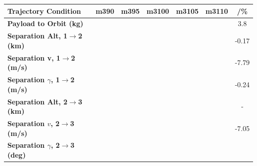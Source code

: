 \begin{table}[ht]
\centering
\begin{tabular}{l c c c c c c} 
	\hline \textbf{Trajectory Condition}
	&m390
	&m395
	&m3100
	&m3105
	&m3110
	& /\%
	\\
	\hline \textbf{Payload to Orbit (kg)}
	& \PayloadToOrbitmThreeNinetyNoReturn
	& \PayloadToOrbitmThreeNinetyFiveNoReturn
	& \PayloadToOrbitmThreeStandardNoReturn
	& \PayloadToOrbitmThreeOneHundredFiveNoReturn
	& \PayloadToOrbitmThreeOneHundredTenNoReturn
	&3.8
	\\
	\textbf{Separation Alt, 1$\rightarrow$2 (km)}
	& \firstsecondSeparationAltmThreeNinetyNoReturn
	& \firstsecondSeparationAltmThreeNinetyFiveNoReturn
	& \firstsecondSeparationAltmThreeStandardNoReturn
	& \firstsecondSeparationAltmThreeOneHundredFiveNoReturn
	& \firstsecondSeparationAltmThreeOneHundredTenNoReturn
	&-0.17
	\\
	\textbf{Separation v, 1$\rightarrow$2 (m/s)}
	& \firstsecondSeparationvmThreeNinetyNoReturn
	& \firstsecondSeparationvmThreeNinetyFiveNoReturn
	& \firstsecondSeparationvmThreeStandardNoReturn
	& \firstsecondSeparationvmThreeOneHundredFiveNoReturn
	& \firstsecondSeparationvmThreeOneHundredTenNoReturn
	&-7.79
	\\
	\textbf{Separation $\gamma$, 1$\rightarrow$2 (m/s)}
	& \firstsecondSeparationgammamThreeNinetyNoReturn
	& \firstsecondSeparationgammamThreeNinetyFiveNoReturn
	& \firstsecondSeparationgammamThreeStandardNoReturn
	& \firstsecondSeparationgammamThreeOneHundredFiveNoReturn
	& \firstsecondSeparationgammamThreeOneHundredTenNoReturn
	&-0.24
	\\
	\textbf{Separation Alt, 2$\rightarrow$3 (km)}
	& \secondthirdSeparationAltmThreeNinetyNoReturn
	& \secondthirdSeparationAltmThreeNinetyFiveNoReturn
	& \secondthirdSeparationAltmThreeStandardNoReturn
	& \secondthirdSeparationAltmThreeOneHundredFiveNoReturn
	& \secondthirdSeparationAltmThreeOneHundredTenNoReturn
	& -
	\\
	\textbf{Separation $v$, 2$\rightarrow$3 (m/s)}
	& \secondthirdSeparationvmThreeNinetyNoReturn
	& \secondthirdSeparationvmThreeNinetyFiveNoReturn
	& \secondthirdSeparationvmThreeStandardNoReturn
	& \secondthirdSeparationvmThreeOneHundredFiveNoReturn
	& \secondthirdSeparationvmThreeOneHundredTenNoReturn
	&-7.05
	\\
	\textbf{Separation $\gamma$, 2$\rightarrow$3 (deg)}
	& \secondthirdSeparationgammamThreeNinetyNoReturn
	& \secondthirdSeparationgammamThreeNinetyFiveNoReturn
	& \secondthirdSeparationgammamThreeStandardNoReturn

\end{tabular}
\end{table}

